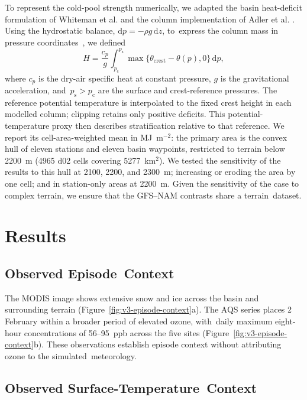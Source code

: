 \documentclass[air,article,accept,moreauthors]{Definitions/mdpi}
\begin{document}
To represent the cold-pool strength numerically, we adapted the basin heat-deficit formulation of Whiteman et al. \citep{Whiteman1999} and the column implementation of Adler et al. \citep{Adler2023}.
Using the hydrostatic balance, $\mathrm{d}p=-\rho g\,\mathrm{d}z$, to~express the column mass in pressure coordinates~\citep{WallaceHobbs2006}, we defined
\begin{equation}
H=\frac{c_{p}}{g}\int_{p_{\mathrm{c}}}^{p_{\mathrm{s}}}\max\{\theta_{\mathrm{crest}}-\theta(p),0\}\,\mathrm{d}p,
\end{equation}
where $c_{p}$ is the dry-air specific heat at constant pressure, $g$ is the gravitational acceleration, and~$p_{\mathrm{s}}>p_{\mathrm{c}}$ are the surface and crest-reference pressures.
The reference potential temperature is interpolated to the fixed crest height in each modelled column; clipping retains only positive deficits.
This potential-temperature proxy then describes stratification relative to that reference.
We report its cell-area-weighted mean in MJ~m$^{-2}$: the primary area is the convex hull of eleven stations and eleven basin waypoints, restricted to terrain below 2200~m (4965 d02 cells covering 5277~km$^{2}$).
We tested the sensitivity of the results to this hull at 2100, 2200, and 2300~m; increasing or eroding the area by one cell; and in station-only areas at 2200~m.
Given the sensitivity of the case to complex terrain, we ensure that the GFS--NAM contrasts share a terrain~dataset.

\section{Results}
\label{sec:v3-results}


\subsection{Observed Episode~Context}
\label{sec:v3-episode-context}

The MODIS image shows extensive snow and ice across the basin and surrounding terrain (Figure~\ref{fig:v3-episode-context}a).
The AQS series places 2 February within a broader period of elevated ozone, with~daily maximum eight-hour concentrations of 56--95~ppb across the five sites (Figure~\ref{fig:v3-episode-context}b).
These observations establish episode context without attributing ozone to the simulated~meteorology.


\subsection{Observed Surface-Temperature~Context}
\label{sec:v3-observed-context}
\end{document}
